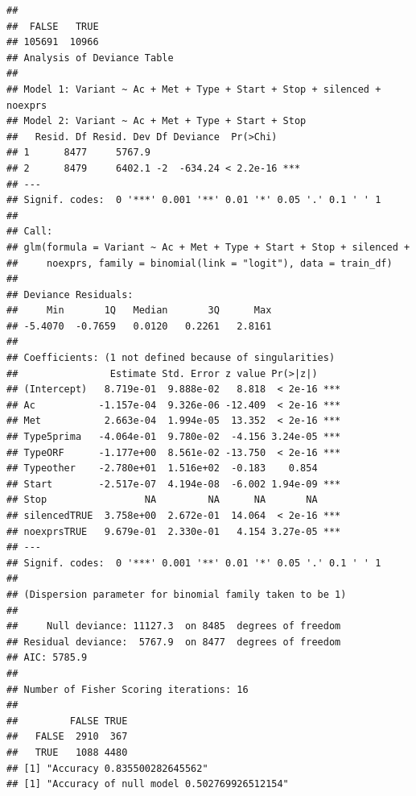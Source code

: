 \documentclass{article}\usepackage[]{graphicx}\usepackage[]{color}
\makeatletter
\newenvironment{kframe}{%
 \def\at@end@of@kframe{}%
 \ifinner\ifhmode%
  \def\at@end@of@kframe{\end{minipage}}%
  \begin{minipage}{\columnwidth}%
 \fi\fi%
 \def\FrameCommand##1{\hskip\@totalleftmargin \hskip-\fboxsep
 \colorbox{shadecolor}{##1}\hskip-\fboxsep
     \hskip-\linewidth \hskip-\@totalleftmargin \hskip\columnwidth}%
 \MakeFramed {\advance\hsize-\width
   \@totalleftmargin\z@ \linewidth\hsize
   \@setminipage}}%
 {\par\unskip\endMakeFramed%
 \at@end@of@kframe}
\newenvironment{knitrout}{}{} %
\makeatother
\begin{document}
\begin{knitrout}
\color{fgcolor}\begin{kframe}
\begin{verbatim}
## 
##  FALSE   TRUE 
## 105691  10966
## Analysis of Deviance Table
## 
## Model 1: Variant ~ Ac + Met + Type + Start + Stop + silenced + noexprs
## Model 2: Variant ~ Ac + Met + Type + Start + Stop
##   Resid. Df Resid. Dev Df Deviance  Pr(>Chi)    
## 1      8477     5767.9                          
## 2      8479     6402.1 -2  -634.24 < 2.2e-16 ***
## ---
## Signif. codes:  0 '***' 0.001 '**' 0.01 '*' 0.05 '.' 0.1 ' ' 1
## 
## Call:
## glm(formula = Variant ~ Ac + Met + Type + Start + Stop + silenced + 
##     noexprs, family = binomial(link = "logit"), data = train_df)
## 
## Deviance Residuals: 
##     Min       1Q   Median       3Q      Max  
## -5.4070  -0.7659   0.0120   0.2261   2.8161  
## 
## Coefficients: (1 not defined because of singularities)
##                Estimate Std. Error z value Pr(>|z|)    
## (Intercept)   8.719e-01  9.888e-02   8.818  < 2e-16 ***
## Ac           -1.157e-04  9.326e-06 -12.409  < 2e-16 ***
## Met           2.663e-04  1.994e-05  13.352  < 2e-16 ***
## Type5prima   -4.064e-01  9.780e-02  -4.156 3.24e-05 ***
## TypeORF      -1.177e+00  8.561e-02 -13.750  < 2e-16 ***
## Typeother    -2.780e+01  1.516e+02  -0.183    0.854    
## Start        -2.517e-07  4.194e-08  -6.002 1.94e-09 ***
## Stop                 NA         NA      NA       NA    
## silencedTRUE  3.758e+00  2.672e-01  14.064  < 2e-16 ***
## noexprsTRUE   9.679e-01  2.330e-01   4.154 3.27e-05 ***
## ---
## Signif. codes:  0 '***' 0.001 '**' 0.01 '*' 0.05 '.' 0.1 ' ' 1
## 
## (Dispersion parameter for binomial family taken to be 1)
## 
##     Null deviance: 11127.3  on 8485  degrees of freedom
## Residual deviance:  5767.9  on 8477  degrees of freedom
## AIC: 5785.9
## 
## Number of Fisher Scoring iterations: 16
##        
##         FALSE TRUE
##   FALSE  2910  367
##   TRUE   1088 4480
## [1] "Accuracy 0.835500282645562"
## [1] "Accuracy of null model 0.502769926512154"
\end{verbatim}


{\ttfamily\noindent\itshape\color{messagecolor}{\#\# Loading required package: gplots}}

{\ttfamily\noindent\itshape\color{messagecolor}{\#\# \\\#\# Attaching package: 'gplots'}}


\end{kframe}
\end{knitrout}
\end{document}
